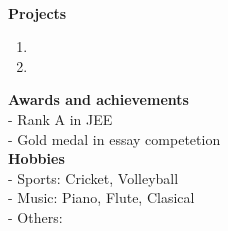 \documentclass{article}
\newcommand\tab[1][1cm]{\hspace*{#1}}
\begin{document}
\vspace{0.6 cm} \\
\noindent\tab[0.1 cm]\textbf{Projects} 
\begin{enumerate}
  \item \lipsum[6]
  \item \lipsum[6]
\end{enumerate} 
\noindent\tab[0.1 cm]\textbf{Awards and achievements} 
\vspace{0.4 cm} \\
\tab[0.7 cm]-  Rank A in JEE \\
\tab[0.7 cm]-  Gold medal in essay competetion 
\vspace{0.4 cm} \\
\noindent\tab[0.1 cm]\textbf{Hobbies}
\vspace{0.4 cm} \\
\tab[0.7 cm]-  Sports: Cricket, Volleyball \\
\tab[0.7 cm]-  Music: Piano, Flute, Clasical \\
\tab[0.7 cm]-  Others:
\end{document}
